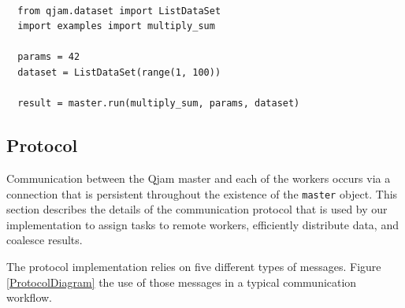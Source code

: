 \documentclass[%
  final,
  notitlepage,
  narroweqnarray,
  inline,
]{ieee}
\begin{document}
{\tt \small
\begin{verbatim}
  from qjam.dataset import ListDataSet
  import examples import multiply_sum

  params = 42
  dataset = ListDataSet(range(1, 100))

  result = master.run(multiply_sum, params, dataset)
\end{verbatim}}


\subsection{Protocol}
\label{Protocol}

Communication between the Qjam master and each of the workers occurs via
a connection that is persistent throughout the existence of the \texttt{master}
object. This section describes the details of the communication protocol that
is used by our implementation to assign tasks to remote workers, efficiently
distribute data, and coalesce results.

The protocol implementation relies on five different types of messages.
Figure \ref{ProtocolDiagram} the use of those messages in a typical
communication workflow.
\end{document}
